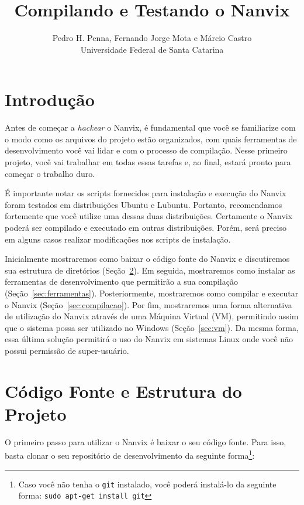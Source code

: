 \documentclass[11pt]{article}
\title{Compilando e Testando o Nanvix}
\author{Pedro H. Penna, Fernando Jorge Mota e Márcio Castro\\[0.3em]
\small Universidade Federal de Santa Catarina}
\date{}
\begin{document}
\maketitle

\noindent 


\section{Introdução}

Antes de começar a \textit{hackear} o Nanvix, é fundamental que você se familiarize com o modo como os arquivos do projeto estão organizados, com quais ferramentas de desenvolvimento você vai lidar e com o processo de compilação. Nesse primeiro projeto, você vai trabalhar em todas essas tarefas e, ao final, estará pronto para começar o trabalho duro.

É importante notar os scripts fornecidos para instalação e execução do Nanvix foram testados em distribuições Ubuntu e Lubuntu. Portanto, recomendamos fortemente que você utilize uma dessas duas distribuições. Certamente o Nanvix poderá ser compilado e executado em outras distribuições. Porém, será preciso em alguns casos realizar modificações nos scripts de instalação. 

Inicialmente mostraremos como baixar o código fonte do Nanvix e discutiremos sua estrutura de diretórios (Seção~\ref{sec:codigo}). Em seguida, mostraremos como instalar as ferramentas de desenvolvimento que permitirão a sua compilação (Seção~\ref{sec:ferramentas}). Posteriormente, mostraremos como compilar e executar o Nanvix (Seção~\ref{sec:compilacao}). Por fim, mostraremos uma forma alternativa de utilização do Nanvix através de uma Máquina Virtual (VM), permitindo assim que o sistema possa ser utilizado no Windows (Seção~\ref{sec:vm}). Da mesma forma, essa última solução permitirá o uso do Nanvix em sistemas Linux onde você não possui permissão de super-usuário.

\section{Código Fonte e Estrutura do Projeto}
\label{sec:codigo}
O primeiro passo para utilizar o Nanvix é baixar o seu código fonte. Para isso, basta clonar o seu repositório de desenvolvimento da seguinte forma\footnote{Caso você não tenha o \texttt{git} instalado, você poderá instalá-lo da seguinte forma: \texttt{sudo apt-get install git}}: \\
\end{document}
